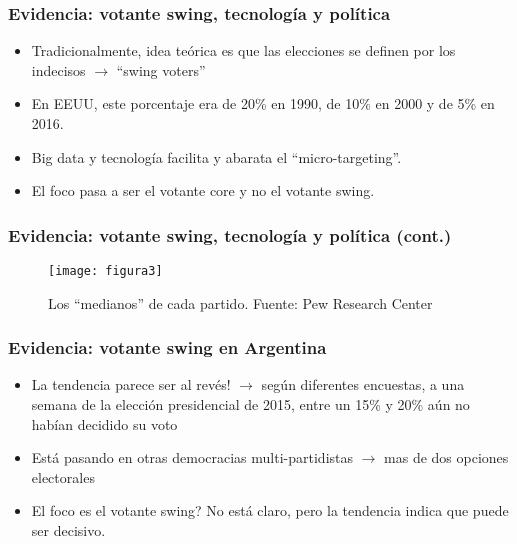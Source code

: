 \documentclass[14pt,aspectratio=169]{beamer}
\begin{document}
  \begin{frame}\frametitle{Evidencia: votante swing, tecnología y política}
          \begin{itemize}\itemsep 15pt
          \item Tradicionalmente, idea teórica es que las elecciones
            se definen por los indecisos $\longrightarrow$ ``swing
            voters''
            \item En EEUU, este porcentaje era de 20\% en 1990, de
              10\% en 2000 y de 5\% en 2016.
              \item Big data y tecnología facilita y abarata el
                ``micro-targeting''.
                \item El foco pasa a ser el votante core y no el
                  votante swing. 
            \end{itemize}
\end{frame}


  \begin{frame}\frametitle{Evidencia: votante swing, tecnología y
      política (cont.)}
   \begin{figure}[htbp]
    \centering
    \texttt{[image: figura3]}
\caption{Los ``medianos'' de cada partido. Fuente: Pew Research Center}
  \end{figure}
          \end{frame}



              \begin{frame}\frametitle{Evidencia: votante swing en Argentina}
 \begin{itemize}\itemsep 15pt
          \item La tendencia parece ser al revés! $\longrightarrow$
            según diferentes encuestas, a una semana de la elección
            presidencial de 2015, entre un 15\% y 20\% aún no habían decidido su
            voto
            \item Está pasando en otras democracias multi-partidistas
              $\longrightarrow$ mas de dos opciones electorales
              \item El foco es el votante swing? No está claro, pero
                la tendencia indica que puede ser decisivo.
            \end{itemize}
            \end{frame}



  
\end{document}
